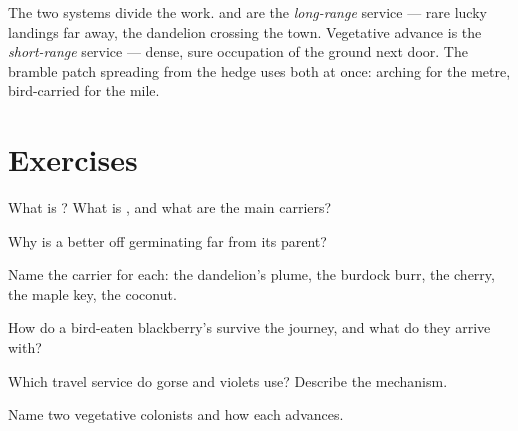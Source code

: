 \begin{remark}\label{rem:g6:how-plants-spread:twospeeds}
The two systems divide the work.  and  are the
\emph{long-range} service --- rare lucky landings far away,
the dandelion crossing the town. Vegetative advance is the
\emph{short-range} service --- dense, sure occupation of the
ground next door. The bramble patch spreading from the hedge
uses both at once: arching  for the metre, bird-carried
 for the mile.
\end{remark}

\section{Exercises}

\begin{exercise}[$\star$]\label{exo:g6:how-plants-spread:1}
What is ? What is , and what are the
main carriers?
\end{exercise}

\begin{exercise}[$\star$]\label{exo:g6:how-plants-spread:2}
Why is a  better off germinating far from its parent?
\end{exercise}

\begin{exercise}[$\star$]\label{exo:g6:how-plants-spread:3}
Name the carrier for each: the dandelion's plume, the
burdock burr, the cherry, the maple key, the coconut.
\end{exercise}

\begin{exercise}[$\star$]\label{exo:g6:how-plants-spread:4}
How do a bird-eaten blackberry's  survive the journey,
and what do they arrive with?
\end{exercise}

\begin{exercise}[$\star$]\label{exo:g6:how-plants-spread:5}
Which travel service do gorse and violets use? Describe the
mechanism.
\end{exercise}

\begin{exercise}[$\star$]\label{exo:g6:how-plants-spread:6}
Name two vegetative colonists and how each advances.
\end{exercise}


